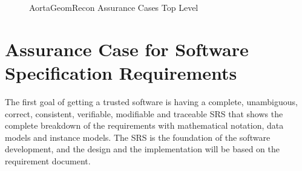 \begin{figure}[H]
    \centering
    \caption[AortaGeomRecon Assurance Cases Top Level]{AortaGeomRecon Assurance Cases Top Level}
    \label{fig_agr_ac_top}
\end{figure}


\section{Assurance Case for Software Specification Requirements}

The first goal of getting a trusted software is having a complete, unambiguous, correct, consistent, verifiable, modifiable and traceable SRS that shows the complete breakdown of the requirements with mathematical notation, data models and instance models. The SRS is the foundation of the software development, and the design and the implementation will be based on the requirement document.

